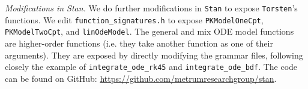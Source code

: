 \documentclass[11pt]{article}
\begin{document}
\textit{Modifications in Stan.} We do further modifications in \texttt{Stan} to expose \texttt{Torsten}'s 
functions. We edit \texttt{function\_signatures.h} to expose \texttt{PKModelOneCpt}, \texttt{PKModelTwoCpt}, 
and \texttt{linOdeModel}. The general and mix ODE model functions are higher-order functions (i.e. they 
take another function as one of their arguments). They are exposed by directly modifying 
the grammar files, following closely the example of \texttt{integrate\_ode\_rk45} and \texttt{integrate\_ode\_bdf}.
The code can be found on GitHub: \url{https://github.com/metrumresearchgroup/stan}.


% 
% 


\end{document}
